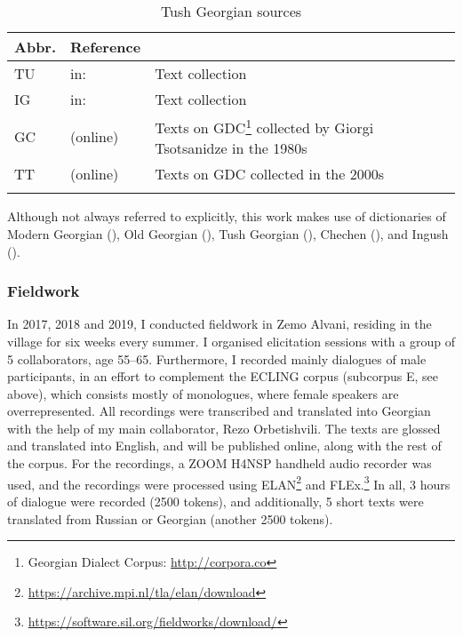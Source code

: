 \begin{table}
		\begin{tabularx}{\textwidth}{llQ}
        \lsptoprule
			Abbr. & Reference & \\\midrule
			TU & in: \cite{uturgaidze60} & Text collection \\
			IG & in: \cite{kartulidialekt} & Text collection \\
			GC & (online) & Texts on GDC\footnote{Georgian Dialect Corpus: \url{http://corpora.co}} collected by Giorgi Tsotsanidze in the 1980s \\
			TT & (online) & Texts on GDC collected in the 2000s \\
		\lspbottomrule
		\end{tabularx}
	\caption{Tush Georgian sources}
	\label{sources-table2}
\end{table}

Although not always referred to explicitly, this work makes use of dictionaries of Modern Georgian (\cite{rayfield06dict}), Old Georgian (\cites[]{abuladze1973dict}), Tush Georgian (\cites[]{tsotsanidze02tushdict}), Chechen (\cite{matsiev61dict,nichols04chechendict}), and Ingush (\cite{nichols04ingushdict}). 


\subsubsection{Fieldwork} \label{fieldwork}

In 2017, 2018 and 2019, I conducted fieldwork in Zemo Alvani, residing in the village for six weeks every summer. I organised elicitation sessions with a group of 5 collaborators, age 55--65. Furthermore, I recorded mainly dialogues of male participants, in an effort to complement the ECLING corpus (subcorpus E, see  above), which consists mostly of monologues, where female speakers are overrepresented. All recordings were transcribed and translated into Georgian with the help of my main collaborator, Rezo Orbetishvili. The texts are glossed and translated into English, and will be published online, along with the rest of the corpus. For the recordings, a ZOOM H4NSP 
handheld audio recorder was used, and the recordings were processed using ELAN\footnote{\url{https://archive.mpi.nl/tla/elan/download}} and FLEx.\footnote{\url{https://software.sil.org/fieldworks/download/}}
In all, 3 hours of dialogue were recorded (2500 tokens), and additionally, 5 short texts were translated from Russian or Georgian (another 2500 tokens).

